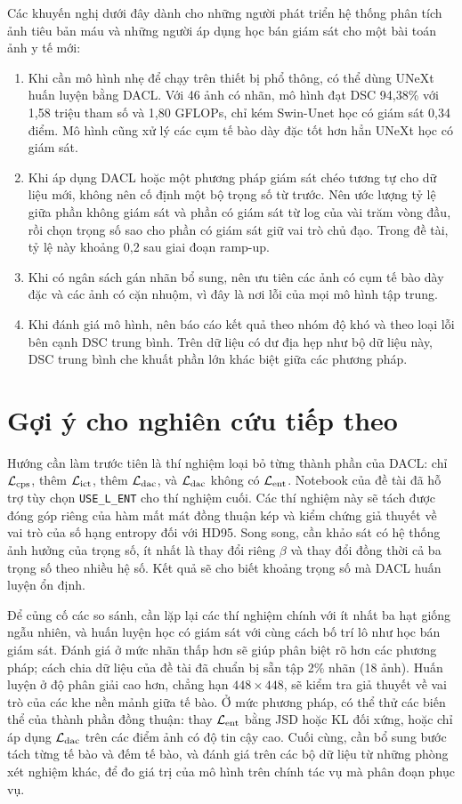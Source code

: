 Các khuyến nghị dưới đây dành cho những người phát triển hệ thống phân tích ảnh tiêu bản máu và những người áp dụng học bán giám sát cho một bài toán ảnh y tế mới:
\begin{enumerate}
  \item Khi cần mô hình nhẹ để chạy trên thiết bị phổ thông, có thể dùng UNeXt huấn luyện bằng DACL. Với 46 ảnh có nhãn, mô hình đạt DSC 94,38\% với 1,58 triệu tham số và 1,80 GFLOPs, chỉ kém Swin-Unet học có giám sát 0,34 điểm. Mô hình cũng xử lý các cụm tế bào dày đặc tốt hơn hẳn UNeXt học có giám sát.
  \item Khi áp dụng DACL hoặc một phương pháp giám sát chéo tương tự cho dữ liệu mới, không nên cố định một bộ trọng số từ trước. Nên ước lượng tỷ lệ giữa phần không giám sát và phần có giám sát từ log của vài trăm vòng đầu, rồi chọn trọng số sao cho phần có giám sát giữ vai trò chủ đạo. Trong đề tài, tỷ lệ này khoảng 0,2 sau giai đoạn ramp-up.
  \item Khi có ngân sách gán nhãn bổ sung, nên ưu tiên các ảnh có cụm tế bào dày đặc và các ảnh có cặn nhuộm, vì đây là nơi lỗi của mọi mô hình tập trung.
  \item Khi đánh giá mô hình, nên báo cáo kết quả theo nhóm độ khó và theo loại lỗi bên cạnh DSC trung bình. Trên dữ liệu có dư địa hẹp như bộ dữ liệu này, DSC trung bình che khuất phần lớn khác biệt giữa các phương pháp.
\end{enumerate}

\section{Gợi ý cho nghiên cứu tiếp theo}

Hướng cần làm trước tiên là thí nghiệm loại bỏ từng thành phần của DACL: chỉ $\mathcal{L}_{\mathrm{cps}}$, thêm $\mathcal{L}_{\mathrm{ict}}$, thêm $\mathcal{L}_{\mathrm{dac}}$, và $\mathcal{L}_{\mathrm{dac}}$ không có $\mathcal{L}_{\mathrm{ent}}$. Notebook của đề tài đã hỗ trợ tùy chọn \texttt{USE\_L\_ENT} cho thí nghiệm cuối. Các thí nghiệm này sẽ tách được đóng góp riêng của hàm mất mát đồng thuận kép và kiểm chứng giả thuyết về vai trò của số hạng entropy đối với HD95. Song song, cần khảo sát có hệ thống ảnh hưởng của trọng số, ít nhất là thay đổi riêng $\beta$ và thay đổi đồng thời cả ba trọng số theo nhiều hệ số. Kết quả sẽ cho biết khoảng trọng số mà DACL huấn luyện ổn định.

Để củng cố các so sánh, cần lặp lại các thí nghiệm chính với ít nhất ba hạt giống ngẫu nhiên, và huấn luyện học có giám sát với cùng cách bố trí lô như học bán giám sát. Đánh giá ở mức nhãn thấp hơn sẽ giúp phân biệt rõ hơn các phương pháp; cách chia dữ liệu của đề tài đã chuẩn bị sẵn tập 2\% nhãn (18 ảnh). Huấn luyện ở độ phân giải cao hơn, chẳng hạn $448\times448$, sẽ kiểm tra giả thuyết về vai trò của các khe nền mảnh giữa tế bào. Ở mức phương pháp, có thể thử các biến thể của thành phần đồng thuận: thay $\mathcal{L}_{\mathrm{ent}}$ bằng JSD hoặc KL đối xứng, hoặc chỉ áp dụng $\mathcal{L}_{\mathrm{dac}}$ trên các điểm ảnh có độ tin cậy cao. Cuối cùng, cần bổ sung bước tách từng tế bào và đếm tế bào, và đánh giá trên các bộ dữ liệu từ những phòng xét nghiệm khác, để đo giá trị của mô hình trên chính tác vụ mà phân đoạn phục vụ.

